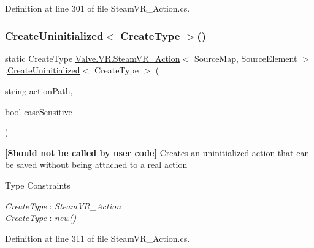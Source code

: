 Definition at line 301 of file Steam\+V\+R\+\_\+\+Action.\+cs.

\mbox{\label{class_valve_1_1_v_r_1_1_steam_v_r___action_ad9e9c7d4a4f472f28dfa9d787919384a}} 
\subsubsection{\texorpdfstring{CreateUninitialized$<$ CreateType $>$()}{CreateUninitialized< CreateType >()}\hspace{0.1cm}{\footnotesize\ttfamily [2/2]}}
{\footnotesize\ttfamily static Create\+Type \mbox{\hyperlink{class_valve_1_1_v_r_1_1_steam_v_r___action}{Valve.\+V\+R.\+Steam\+V\+R\+\_\+\+Action}}$<$ Source\+Map, Source\+Element $>$.\mbox{\hyperlink{class_valve_1_1_v_r_1_1_steam_v_r___action_af69bed4c4b5b9640c2cac9e118743df3}{Create\+Uninitialized}}$<$ Create\+Type $>$ (\begin{DoxyParamCaption}\item[{string}]{action\+Path,  }\item[{bool}]{case\+Sensitive }\end{DoxyParamCaption})\hspace{0.3cm}{\ttfamily [static]}}



{\bfseries{\mbox{[}Should not be called by user code\mbox{]}}} Creates an uninitialized action that can be saved without being attached to a real action 

\begin{Desc}
\item[Type Constraints]\begin{description}
\item[{\em Create\+Type} : {\em Steam\+V\+R\+\_\+\+Action}]\item[{\em Create\+Type} : {\em new()}]\end{description}
\end{Desc}


Definition at line 311 of file Steam\+V\+R\+\_\+\+Action.\+cs.

